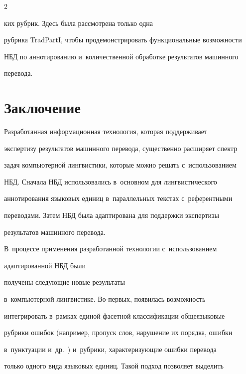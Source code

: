    \begin{multicols}{2}





\noindent


ких руб\-рик. Здесь была рассмотрена только одна 


руб\-ри\-ка TradPartI, чтобы продемонстрировать функциональные возможности 


НБД по аннотированию и~количественной обработке результатов машинного 


перевода.





\section{Заключение}





  Разработанная информационная технология, которая поддерживает 


экспертизу результатов машинного перевода, существенно расширяет спектр 


задач компьютерной лингвистики, которые можно решать с~использованием 


НБД. Сначала НБД использовались в~основном для лингвистического 


аннотирования языковых единиц в~параллельных текстах с~референтными 


переводами. Затем НБД была адаптирована для поддержки экспертизы 


результатов машинного перевода.


  


  В~процессе применения разработанной технологии с~использованием 


адаптированной НБД были\linebreak


 получены следующие новые результаты 


в~компьютерной лингвистике. Во-пер\-вых, появилась возмож\-ность 


интегрировать в~рамках единой фасетной классификации общеязыковые 


рубрики ошибок (например, пропуск слов, нарушение их порядка, ошибки 


в~пунктуации и~др.~\cite{3-gz}) и~рубрики, характеризующие ошибки перевода 


только одного вида языковых единиц. Такой подход позволяет выделить 



\end{multicols}
